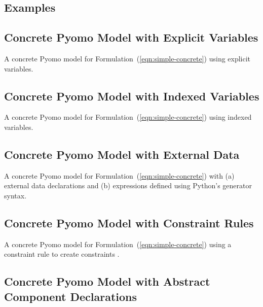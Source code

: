 \begin{subappendices}

\section{Examples}

\subsection{Concrete Pyomo Model with Explicit Variables}
\label{ex:concrete1}

A concrete Pyomo model for Formulation~(\ref{eqn:simple-concrete}) using explicit variables.


\subsection{Concrete Pyomo Model with Indexed Variables}
\label{ex:concrete2}

A concrete Pyomo model for Formulation~(\ref{eqn:simple-concrete}) using indexed variables.


\subsection{Concrete Pyomo Model with External Data}
\label{ex:concrete3}

A concrete Pyomo model for Formulation~(\ref{eqn:simple-concrete}) 
with (a) external data declarations and (b) expressions defined using Python's generator syntax.


\subsection{Concrete Pyomo Model with Constraint Rules}
\label{ex:concrete4}

A concrete Pyomo model for Formulation~(\ref{eqn:simple-concrete}) using a constraint rule to create constraints .


\subsection{Concrete Pyomo Model with Abstract Component Declarations}
\label{ex:concrete5}


\end{subappendices}
